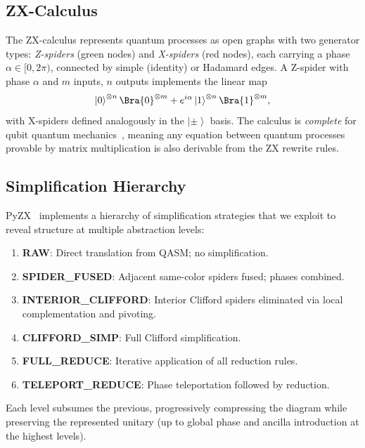 \documentclass[twocolumn,prl,amsmath,amssymb,superscriptaddress]{revtex4-2}
\newcommand{\Ket}[1]{\left|#1\right\rangle}
\begin{document}
\subsection{ZX-Calculus}

The ZX-calculus represents quantum processes as open graphs with two generator types: \emph{Z-spiders} (green nodes) and \emph{X-spiders} (red nodes), each carrying a phase $\alpha \in [0, 2\pi)$, connected by simple (identity) or Hadamard edges.
A Z-spider with phase $\alpha$ and $m$ inputs, $n$ outputs implements the linear map
\begin{equation}
    \Ket{0}^{\otimes n}\Bra{0}^{\otimes m} + e^{i\alpha}\Ket{1}^{\otimes n}\Bra{1}^{\otimes m},
\end{equation}
with X-spiders defined analogously in the $\Ket{\pm}$ basis.
The calculus is \emph{complete} for qubit quantum mechanics~\cite{Hadzihasanovic2018,Jeandel2018}, meaning any equation between quantum processes provable by matrix multiplication is also derivable from the ZX rewrite rules.

\subsection{Simplification Hierarchy}

PyZX~\cite{Kissinger2020} implements a hierarchy of simplification strategies that we exploit to reveal structure at multiple abstraction levels:

\begin{enumerate}
    \item \textbf{RAW}: Direct translation from QASM; no simplification.
    \item \textbf{SPIDER\_FUSED}: Adjacent same-color spiders fused; phases combined.
    \item \textbf{INTERIOR\_CLIFFORD}: Interior Clifford spiders eliminated via local complementation and pivoting.
    \item \textbf{CLIFFORD\_SIMP}: Full Clifford simplification.
    \item \textbf{FULL\_REDUCE}: Iterative application of all reduction rules.
    \item \textbf{TELEPORT\_REDUCE}: Phase teleportation followed by reduction.
\end{enumerate}

Each level subsumes the previous, progressively compressing the diagram while preserving the represented unitary (up to global phase and ancilla introduction at the highest levels).
\end{document}
